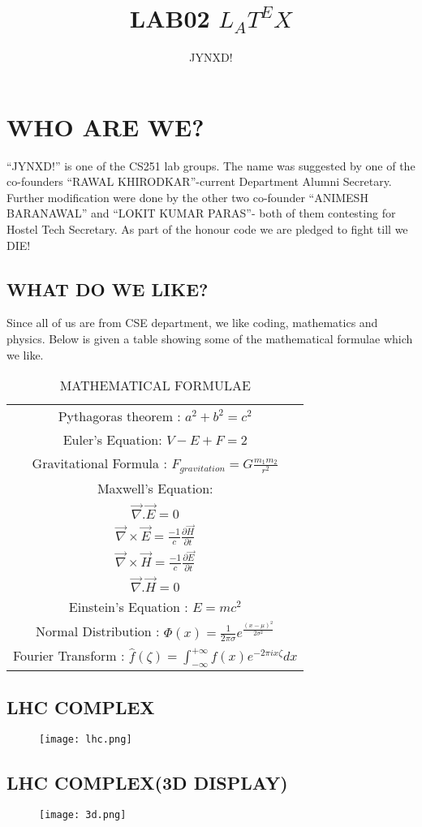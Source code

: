 \documentclass{article}
\begin{document}
\title{LAB02 $L_AT^EX$}
\author{JYNXD!}
\maketitle

\section{WHO ARE WE?}
``JYNXD!'' is one of the CS251 lab groups. The name was suggested by one of the co-founders ``RAWAL KHIRODKAR''-current Department Alumni Secretary. Further modification were done by the other two co-founder ``ANIMESH BARANAWAL'' and ``LOKIT KUMAR PARAS''- both of them contesting for Hostel Tech Secretary. As part of the honour code we are pledged to fight till we DIE!

\subsection{WHAT DO WE LIKE?}
Since all of us are from CSE department, we like coding, mathematics and physics. Below is given a table showing some of the mathematical formulae which we like.

\begin{table}[h!]
\centering
\begin{tabular}{ ||c|| }
\hline
Pythagoras theorem : $ a^2 + b^2 = c^2 $ \\[1ex]
Euler's Equation: $ V - E + F = 2 $\\[1ex]
Gravitational Formula : $ F_{gravitation} = G\frac{m_1m_2}{r^2}  $\\ [1ex]
Maxwell's Equation: \\
    $\overrightarrow{\nabla} . \overrightarrow{E} = 0$  \\[1ex]
    $\overrightarrow{\nabla} \times \overrightarrow{E} = \frac{-1}{c} \frac{\partial \overrightarrow{H} }{ \partial t} $\\[1ex]
    $\overrightarrow{\nabla} \times \overrightarrow{H} = \frac{-1}{c} \frac{\partial \overrightarrow{E}}{\partial t} $ \\[1ex]
    $\overrightarrow{\nabla} . \overrightarrow{H} = 0 $\\[1ex]
Einstein's Equation : $ E = mc^2 $\\ [1ex]
Normal Distribution : $ \Phi \left( x \right) = \frac{1}{2\pi\sigma}e^{\frac{\left( x - \mu\right)^2}{2\sigma^2} } $ \\[1ex]
Fourier Transform : $ \hat {f} \left( \zeta \right) = \int_{-\infty}^{+\infty} f\left( x \right) e^{-2\pi ix\zeta} dx $ \\[1ex]

\hline
\end{tabular}
\caption{MATHEMATICAL FORMULAE}
\end{table}

\subsection{ LHC COMPLEX }
\begin{figure}[H]
\texttt{[image: lhc.png]}
\end{figure}

\subsection{ LHC COMPLEX(3D DISPLAY) }
\begin{figure}[H]
\texttt{[image: 3d.png]}
\end{figure}
\end{document}
